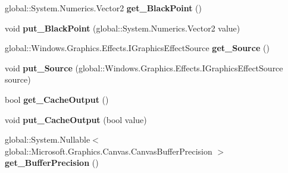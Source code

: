 \begin{DoxyCompactItemize}
global\+::\+System.\+Numerics.\+Vector2 {\bfseries get\+\_\+\+Black\+Point} ()
\item 
\mbox{\label{class_microsoft_1_1_graphics_1_1_canvas_1_1_effects_1_1_brightness_effect_ace38eda2b5d63e091a80c2ca5ce0c214}} 
void {\bfseries put\+\_\+\+Black\+Point} (global\+::\+System.\+Numerics.\+Vector2 value)
\item 
\mbox{\label{class_microsoft_1_1_graphics_1_1_canvas_1_1_effects_1_1_brightness_effect_a7b0bb58e7e2d295dbbf1915014ecf6a7}} 
global\+::\+Windows.\+Graphics.\+Effects.\+I\+Graphics\+Effect\+Source {\bfseries get\+\_\+\+Source} ()
\item 
\mbox{\label{class_microsoft_1_1_graphics_1_1_canvas_1_1_effects_1_1_brightness_effect_a1b63503e02351c27c159def6ef491a70}} 
void {\bfseries put\+\_\+\+Source} (global\+::\+Windows.\+Graphics.\+Effects.\+I\+Graphics\+Effect\+Source source)
\item 
\mbox{\label{class_microsoft_1_1_graphics_1_1_canvas_1_1_effects_1_1_brightness_effect_afc318ab58e1e1689a15fea4fae102922}} 
bool {\bfseries get\+\_\+\+Cache\+Output} ()
\item 
\mbox{\label{class_microsoft_1_1_graphics_1_1_canvas_1_1_effects_1_1_brightness_effect_a6408ed4eabb4d5b57cd49bffe7443269}} 
void {\bfseries put\+\_\+\+Cache\+Output} (bool value)
\item 
\mbox{\label{class_microsoft_1_1_graphics_1_1_canvas_1_1_effects_1_1_brightness_effect_a7d4afbeeaf13fe577e739414d47c7612}} 
global\+::\+System.\+Nullable$<$ global\+::\+Microsoft.\+Graphics.\+Canvas.\+Canvas\+Buffer\+Precision $>$ {\bfseries get\+\_\+\+Buffer\+Precision} ()
\item 
\mbox{\label{class_microsoft_1_1_graphics_1_1_canvas_1_1_effects_1_1_brightness_effect_a9f7717625241b437eef1f56484e31539}} 

\end{DoxyCompactItemize}
